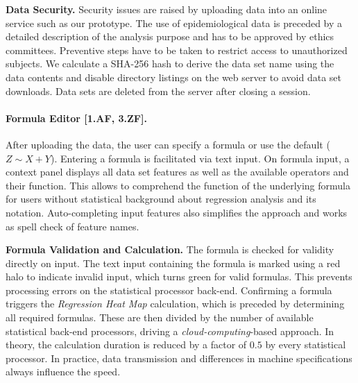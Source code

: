 \documentclass[journal]{style/vgtc} 			          %
\begin{document}

\textbf{Data Security.}
Security issues are raised by uploading data into an online service such as our prototype.
The use of epidemiological data is preceded by a detailed description of the analysis purpose and has to be approved by ethics committees.
Preventive steps have to be taken to restrict access to unauthorized subjects.
We calculate a SHA-256 hash to derive the data set name using the data contents and disable directory listings on the web server to avoid data set downloads.
Data sets are deleted from the server after closing a session.

\paragraph{Formula Editor [1.AF, 3.ZF].}
After uploading the data, the user can specify a formula or use the default ($Z \sim X + Y$).
Entering a formula is facilitated via text input.
On formula input, a context panel displays all data set features as well as the available operators and their function.
This allows to comprehend the function of the underlying formula for users without statistical background about regression analysis and its notation.
Auto-completing input features also simplifies the approach and works as spell check of feature names.

\textbf{Formula Validation and Calculation.} The formula is checked for validity directly on input.
The text input containing the formula is marked using a red halo to indicate invalid input, which turns green for valid formulas.
This prevents processing errors on the statistical processor back-end.
Confirming a formula triggers the \emph{Regression Heat Map} calculation, which is preceded by determining all required formulas.
These are then divided by the number of available statistical back-end processors, driving a \emph{cloud-computing}-based approach.
In theory, the calculation duration is reduced by a factor of $0.5$ by every statistical processor.
In practice, data transmission and differences in machine specifications always influence the speed.
\end{document}
